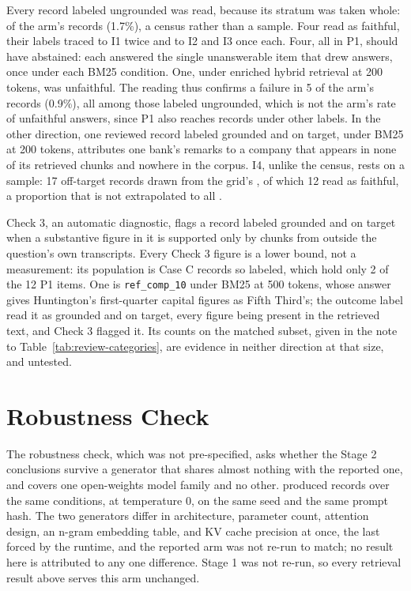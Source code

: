Every record labeled ungrounded was read, because its stratum was taken whole:
\thesisQeightAnsweredUngrounded{} of the arm's \thesisQeightNumRecords{}
records (1.7\%), a census rather than a sample. Four read as faithful, their
labels traced to I1 twice and to I2 and I3 once each. Four, all in P1, should
have abstained: each answered the single unanswerable item that drew answers,
once under each BM25 condition. One, under enriched hybrid retrieval at 200
tokens, was unfaithful. The reading thus confirms a failure in 5 of the arm's
\thesisQeightNumRecords{} records (0.9\%), all among those labeled ungrounded,
which is not the arm's rate of unfaithful answers, since P1 also reaches records
under other labels. In the
other direction, one reviewed record labeled grounded and on target, under
BM25 at 200 tokens, attributes one bank's
remarks to a company that appears in none of its retrieved chunks and nowhere
in the corpus.
I4, unlike the census, rests on a sample: 17 off-target records drawn from the
grid's \thesisQeightAnsweredGroundedOfftarget{}, of which 12 read as faithful, a
proportion that is not extrapolated to all
\thesisQeightAnsweredGroundedOfftarget{}.

Check 3, an automatic diagnostic, flags a record labeled grounded and on target
when a substantive figure in it is supported only by chunks from outside the
question's own transcripts. Every Check 3 figure is a lower bound, not a
measurement: its population is Case C records so labeled, which hold only 2 of
the 12 P1 items. One is \texttt{ref\_comp\_10} under BM25 at 500 tokens,
whose answer gives Huntington's first-quarter capital figures as Fifth Third's;
the outcome label read it as grounded and on target, every figure being present
in the retrieved text, and Check 3 flagged it. Its counts on the matched subset,
given in the note to Table~\ref{tab:review-categories}, are evidence in neither
direction at that size, and untested.

\section{Robustness Check}

The robustness check, which was not pre-specified, asks whether the Stage 2
conclusions survive a generator that shares almost nothing with the reported
one, and covers one open-weights model family and no other.
\thesisFlashRobustnessModel{} \parencite{qwen3.8-flash-next} produced
\thesisFlashRobustnessNumRecords{} records over the same \thesisNumConditions{}
conditions, at temperature 0, on the same seed and the same prompt hash. The
two generators differ in architecture, parameter count, attention design, an
n-gram embedding table, and KV cache precision at once, the last forced by the
runtime, and the reported arm was not re-run to match; no result here is
attributed to any one difference. Stage 1 was not re-run, so every retrieval
result above serves this arm unchanged.

